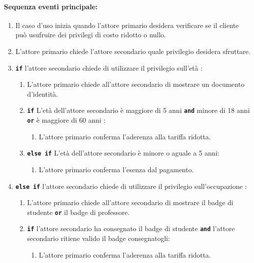 \documentclass{article}
\begin{document}
	\paragraph{Sequenza eventi principale:}
\begin{enumerate}[itemsep=8pt,parsep=0pt]

    \item Il caso d'uso inizia quando l'attore primario desidera verificare se il cliente può usufruire dei privilegi di costo ridotto o nullo.

	\item L'attore primario chiede l'attore secondario quale privilegio desidera sfruttare.
    
    \item   \texttt{\textbf{if}} l'attore secondario chiede di utilizzare il privilegio sull'età :
        \begin{enumerate}[itemsep=8pt,parsep=0pt]
		\item L'attore primario chiede all'attore secondario di mostrare un documento d'identità.
			\item   \texttt{\textbf{if}} L'età dell'attore secondario è maggiore di 5 anni \texttt{\textbf{and}} minore di 18 anni \texttt{\textbf{or}} è maggiore di 60 anni : 
			        \begin{enumerate}[itemsep=8pt,parsep=0pt]
						\item L'attore primario conferma l'aderenza alla tariffa ridotta.
					\end{enumerate}

			\item   \texttt{\textbf{else if}} L'età dell'attore secondario è minore o aguale a 5 anni:
			        \begin{enumerate}[itemsep=8pt,parsep=0pt]
						\item L'attore primario conferma l'esenza dal pagamento.
					\end{enumerate}
        \end{enumerate}

    \item   \texttt{\textbf{else if}} l'attore secondario chiede di utilizzare il privilegio sull'occupazione :
        \begin{enumerate}[itemsep=8pt,parsep=0pt]
		\item L'attore primario chiede all'attore secondario di mostrare il badge di studente \texttt{\textbf{or}} il badge di professore.
			\item   \texttt{\textbf{if}} l'attore secondario ha consegnato il badge di studente \texttt{\textbf{and}} l'attore secondario ritiene valido il badge consegnatogli:
			        \begin{enumerate}[itemsep=8pt,parsep=0pt]
						\item L'attore primario conferma l'aderenza alla tariffa ridotta.
					\end{enumerate}


\end{enumerate}
\end{enumerate}
\end{document}
